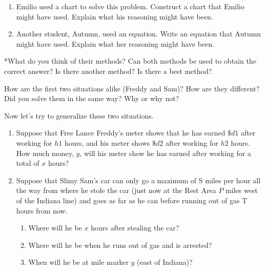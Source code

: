 \documentclass[nooutcomes, noauthor, handout]{ximera}
\begin{document}
\begin{problem}
\begin{problem}
\begin{enumerate}
\item Emilio used a chart to solve this problem.  Construct a chart that Emilio might have used.  Explain what his reasoning might have been.

\item Another student, Autumn, used an equation. Write an equation that Autumn might have used.   Explain what her reasoning might have been.

\end{enumerate}

*What do you think of their methods?  Can both methods be used to obtain the correct answer?  Is there another method? Is there a best method? 
\end{problem}


\end{problem}

\pagebreak

\begin{problem}
How are the first two situations alike (Freddy and Sam)?  How are they different?  Did you solve them in the same way?  Why or why not?
\end{problem}

 \vskip 3in


\begin{problem} 
Now let's try to generalize these two situations.
\begin{enumerate}
    \item Suppose that Free Lance Freddy's meter shows that he has earned $\$d1 $ after working for $h1$ hours, and his meter shows $\$d2 $ after working for $h2 $ hours. How much money, $y$, will his meter show he has earned after working for a total of $x$ hours?
    \item Suppose that Slimy Sam's car can only go a maximum of S miles per hour all the way from where he stole the car (just now at the Rest Area $P$ miles west of the Indiana line) and goes as far as he can before running out of gas T hours from now.
\begin{enumerate}[label=(\roman*)]
 \item Where will he be $x$ hours after stealing the car?
 \item Where will he be when he runs out of gas and is arrested?
 \item  When will he be at mile marker $y$ (east of Indiana)?
\end{enumerate}

\end{enumerate}


\end{problem}
\end{document}
